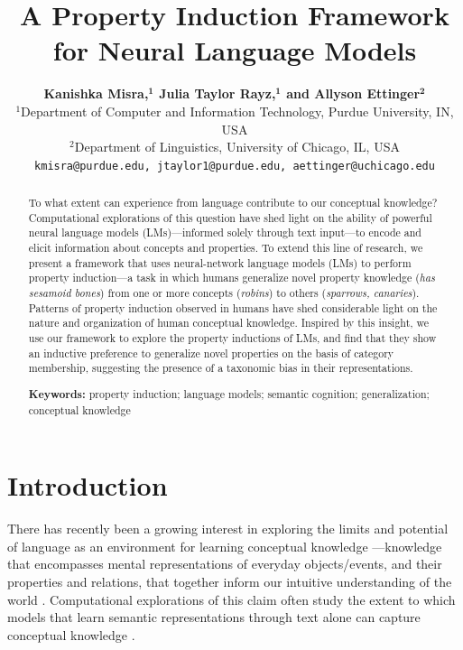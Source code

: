 \documentclass[10pt,letterpaper]{article}
\title{A Property Induction Framework for Neural Language Models}
\author{
{\large \bf Kanishka Misra,$^\textbf{1}$ Julia Taylor Rayz,$^\textbf{1}$ and Allyson Ettinger$^\textbf{2}$}\\
  $^1$Department of Computer and Information Technology,
  Purdue University, IN, USA \\
  $^2$Department of Linguistics, University of Chicago, IL, USA\\
  \texttt{kmisra@purdue.edu, jtaylor1@purdue.edu, aettinger@uchicago.edu}
}
\begin{document}
\maketitle


\begin{abstract}
To what extent can experience from language contribute to our conceptual knowledge? 
Computational explorations of this question have shed light on the ability of powerful neural language models (LMs)---informed solely through text input---to encode and elicit information about concepts and properties. To extend this line of research, we present a framework that uses neural-network language models (LMs) to perform property induction---a task in which humans generalize novel property knowledge (\textit{has sesamoid bones}) from one or more concepts (\textit{robins}) to others (\textit{sparrows, canaries}). Patterns of property induction observed in humans have shed considerable light on the nature and organization of human conceptual knowledge. Inspired by this insight, we use our framework to explore the property inductions of LMs, and find that they show an inductive preference to generalize novel properties on the basis of category membership, suggesting the presence of a taxonomic bias in their representations.

\textbf{Keywords:} 
property induction; language models; semantic cognition; generalization; conceptual knowledge
\end{abstract}

\section{Introduction}

There has recently been a growing interest in exploring the limits and potential of language as an environment for learning conceptual knowledge \citep{elman2004alternative, lupyan2019words}---knowledge that encompasses mental representations of everyday objects/events, and their properties and relations, that together inform our intuitive understanding of the world \citep{murphy2004big, machery2009doing}.
Computational explorations of this claim often study the extent to which models that learn semantic representations through text alone can capture conceptual knowledge \citep{lucy-gauthier-2017-distributional, forbes2019neural, da-kasai-2019-cracking, bhatia2020transformer}.
\end{document}
